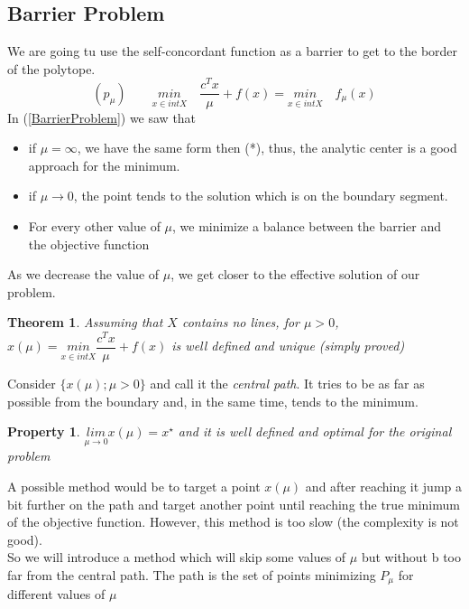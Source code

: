 \documentclass[10pt,a4paper]{article}
\begin{document}
\subsection{Barrier Problem} 
We are going tu use the self-concordant function as a barrier to get to the border of the polytope.
\begin{equation}
\label{BarrierProblem}
(p_{\mu}) \qquad \underset{x \in int X}{min} \quad \dfrac{c^T x}{\mu} + f(x) = \underset{x \in int X}{min} \quad f_{\mu}(x)
\end{equation}
In (\ref{BarrierProblem}) we saw that
\begin{itemize}
\item if $\mu = \infty$, we have the same form then (*), thus, the analytic center is a good approach for the minimum.
\item if $\mu \rightarrow 0$, the point tends to the solution which is on the boundary segment.
\item For every other value of $\mu$, we minimize a balance between the barrier and the objective function
\end{itemize}
As we decrease the value of $\mu$, we get closer to the effective solution of our problem.
\newline
\newtheorem{theo1}{Theorem}
\begin{theo1} Assuming that $X$ contains no lines, for $\mu > 0$, $x(\mu) = \underset{x \in int X}{min} \dfrac{c^T x}{\mu} + f(x)$ is well defined and unique (simply proved)
\end{theo1}
Consider $\lbrace x(\mu) ; \mu > 0 \rbrace$ and call it the \textit{central path}. It tries to be as far as possible from the boundary  and, in the same time, tends to the minimum. 
\newtheorem{theo}{Property}
\begin{theo}
$\underset{\mu \rightarrow 0}{lim} x(\mu) = x^{\star}$ and it is well defined and optimal for the original problem
\end{theo} 
A possible method would be to target a point $x(\mu)$ and after reaching it jump a bit further on the path and target another point until reaching the true minimum of the objective function. However, this method is too slow (the complexity is not good).\\
So we will introduce a method which will skip some values of $\mu$ but without b too far from the central path. 
The path is the set of points minimizing $P_\mu$ for different values of $\mu$
\end{document}
